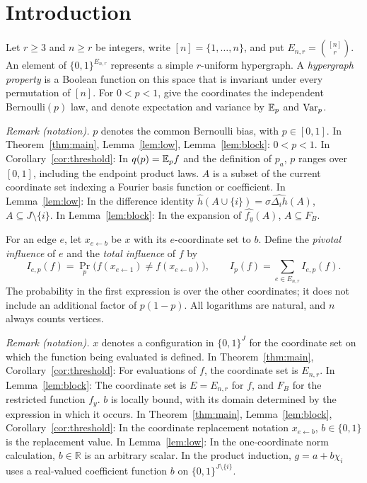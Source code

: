 \section{Introduction}
\label{sec:introduction}

Let $r\ge3$ and $n\ge r$ be integers, write $[n]=\{1,\ldots,n\}$,
and put $E_{n,r}=\binom{[n]}r$.
An element of $\{0,1\}^{E_{n,r}}$ represents a simple $r$-uniform
hypergraph. A \emph{hypergraph property} is a Boolean function on this
space that is invariant under every permutation of $[n]$.
For $0<p<1$, give the coordinates the independent Bernoulli$(p)$ law,
and denote expectation and variance by $\mathbb E_p$ and $\operatorname{Var}_p$.

\noindent\textit{Remark (notation).} $p$ denotes the common Bernoulli bias, with $p\in[0,1]$. In Theorem~\ref{thm:main}, Lemma~\ref{lem:low}, Lemma~\ref{lem:block}: $0<p<1$. In Corollary~\ref{cor:threshold}: In $q(p)=\mathbb E_p f$ and the definition of $p_a$, $p$ ranges over $[0,1]$, including the endpoint product laws. $A$ is a subset of the current coordinate set indexing a Fourier basis function or coefficient. In Lemma~\ref{lem:low}: In the difference identity $\widehat h(A\cup\{i\})=\sigma\widehat{\Delta_i h}(A)$, $A\subseteq J\setminus\{i\}$. In Lemma~\ref{lem:block}: In the expansion of $\widehat{f_y}(A)$, $A\subseteq F_B$.


For an edge $e$, let $x_{e\leftarrow b}$ be $x$ with its $e$-coordinate
set to $b$. Define the \emph{pivotal influence} of $e$ and the
\emph{total influence} of $f$ by
\[
 I_{e,p}(f)=\Pr_p\bigl(f(x_{e\leftarrow1})\ne
                         f(x_{e\leftarrow0})\bigr),
 \qquad I_p(f)=\sum_{e\in E_{n,r}}I_{e,p}(f).
\]
The probability in the first expression is over the other coordinates;
it does not include an additional factor of $p(1-p)$.
All logarithms are natural, and $n$ always counts vertices.

\noindent\textit{Remark (notation).} $x$ denotes a configuration in $\{0,1\}^{J}$ for the coordinate set on which the function being evaluated is defined. In Theorem~\ref{thm:main}, Corollary~\ref{cor:threshold}: For evaluations of $f$, the coordinate set is $E_{n,r}$. In Lemma~\ref{lem:block}: The coordinate set is $E=E_{n,r}$ for $f$, and $F_B$ for the restricted function $f_y$. $b$ is locally bound, with its domain determined by the expression in which it occurs. In Theorem~\ref{thm:main}, Lemma~\ref{lem:block}, Corollary~\ref{cor:threshold}: In the coordinate replacement notation $x_{e\leftarrow b}$, $b\in\{0,1\}$ is the replacement value. In Lemma~\ref{lem:low}: In the one-coordinate norm calculation, $b\in\mathbb R$ is an arbitrary scalar. In the product induction, $g=a+b\chi_i$ uses a real-valued coefficient function $b$ on $\{0,1\}^{J\setminus\{i\}}$.


